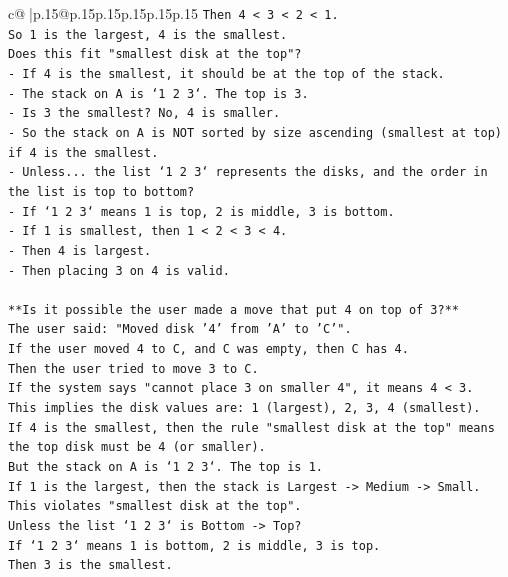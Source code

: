 \documentclass{article}
\begin{document}
{\begin{supertabular}{c@{$\;$}|p{.15\linewidth}@{}p{.15\linewidth}p{.15\linewidth}p{.15\linewidth}p{.15\linewidth}p{.15\linewidth}}
{{{\texttt{Then 4 < 3 < 2 < 1.} \\
\texttt{So 1 is the largest, 4 is the smallest.} \\
\texttt{Does this fit "smallest disk at the top"?} \\
\texttt{{-} If 4 is the smallest, it should be at the top of the stack.} \\
\texttt{{-} The stack on A is `1 2 3`. The top is 3.} \\
\texttt{{-} Is 3 the smallest? No, 4 is smaller.} \\
\texttt{{-} So the stack on A is NOT sorted by size ascending (smallest at top) if 4 is the smallest.} \\
\texttt{{-} Unless... the list `1 2 3` represents the disks, and the order in the list is top to bottom?} \\
\texttt{{-} If `1 2 3` means 1 is top, 2 is middle, 3 is bottom.} \\
\texttt{{-} If 1 is smallest, then 1 < 2 < 3 < 4.} \\
\texttt{{-} Then 4 is largest.} \\
\texttt{{-} Then placing 3 on 4 is valid.} \\
\\ 
\texttt{**Is it possible the user made a move that put 4 on top of 3?**} \\
\texttt{The user said: "Moved disk '4' from 'A' to 'C'".} \\
\texttt{If the user moved 4 to C, and C was empty, then C has 4.} \\
\texttt{Then the user tried to move 3 to C.} \\
\texttt{If the system says "cannot place 3 on smaller 4", it means 4 < 3.} \\
\texttt{This implies the disk values are: 1 (largest), 2, 3, 4 (smallest).} \\
\texttt{If 4 is the smallest, then the rule "smallest disk at the top" means the top disk must be 4 (or smaller).} \\
\texttt{But the stack on A is `1 2 3`. The top is 1.} \\
\texttt{If 1 is the largest, then the stack is Largest {-}> Medium {-}> Small.} \\
\texttt{This violates "smallest disk at the top".} \\
\texttt{Unless the list `1 2 3` is Bottom {-}> Top?} \\
\texttt{If `1 2 3` means 1 is bottom, 2 is middle, 3 is top.} \\
\texttt{Then 3 is the smallest.} \\
}}}
\end{supertabular}}
\end{document}
